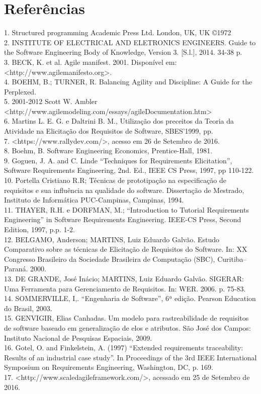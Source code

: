 
\chapter[Referências]{Referências}
1. Structured programming  Academic Press Ltd. London, UK, UK ©1972\\
2. INSTITUTE OF ELECTRICAL AND ELETRONICS ENGINEERS. Guide to the Software Engineering Body of Knowledge, Version 3. [S.l.], 2014. 34-38 p.\\
3. BECK, K. et al. Agile manifest. 2001. Disponível em: <http://www.agilemanifesto.org>.\\
4. BOEHM, B.; TURNER, R. Balancing Agility and Discipline: A Guide for the Perplexed.\\
5. 2001-2012 Scott W. Ambler \\<http://www.agilemodeling.com/essays/agileDocumentation.htm>\\
6. Martins L. E. G. e Daltrini B. M., Utilização dos preceitos da Teoria da Atividade na Elicitação dos Requisitos de Software, SBES’1999, pp.\\
7. <https://www.rallydev.com/>, acesso em 26 de Setembro de 2016.\\
8. Boehm, B. Software Engineering Economics, Prentice-Hall, 1981.\\
9. Goguen, J. A. and C. Linde “Techniques for Requirements Elicitation”, Software Requirements Engineering, 2nd. Ed., IEEE CS Press, 1997, pp 110-122.\\
10. Portella Cristiano R.R; Técnicas de prototipação na especificação de requisitos e sua influência na qualidade do software. Dissertação de Mestrado, Instituto de Informática PUC-Campinas, Campinas, 1994.\\
11. THAYER, R.H. e DORFMAN, M.; “Introduction to Tutorial Requirements Engineering” in Software Requirements Engineering. IEEE-CS Press, Second Edition, 1997, p.p. 1-2.\\
12. BELGAMO, Anderson; MARTINS, Luiz Eduardo Galvão. Estudo Comparativo sobre as técnicas de Elicitação de Requisitos do Software. In: XX Congresso Brasileiro da Sociedade Brasileira de Computação (SBC), Curitiba–Paraná. 2000.\\
13. DE GRANDE, José Inácio; MARTINS, Luiz Eduardo Galvão. SIGERAR: Uma Ferramenta para Gerenciamento de Requisitos. In: WER. 2006. p. 75-83.\\
14. SOMMERVILLE, I,. “Engenharia de Software”, 6ª edição. Pearson Education do Brasil, 2003.\\
15. GENVIGIR, Elias Canhadas. Um modelo para rastreabilidade de requisitos de software baseado em generalização de elos e atributos. São José dos Campos: Instituto Nacional de Pesquisas Espaciais, 2009.\\
16. Gotel, O. and Finkelstein, A. (1997) “Extended requirements traceability: Results of an industrial case study”. In Proceedings of the 3rd IEEE International Symposium on Requirements Engineering, Washington, DC, p. 169.\\
17. <http://www.scaledagileframework.com/>, acessado em 25 de Setembro de 2016.
